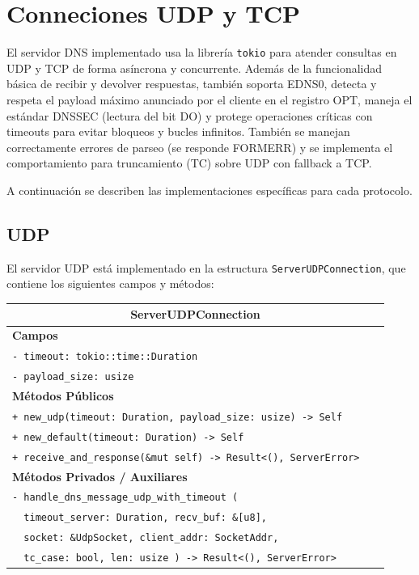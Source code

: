 \chapter{Conneciones UDP y TCP}

El servidor DNS implementado usa la librería \texttt{tokio} para atender consultas en UDP y TCP de forma asíncrona y concurrente. 
Además de la funcionalidad básica de recibir y devolver respuestas, también soporta EDNS0, detecta y respeta el payload máximo 
anunciado por el cliente en el registro OPT, maneja el estándar DNSSEC (lectura del bit DO) y protege operaciones críticas
con timeouts para evitar bloqueos y bucles infinitos. También se manejan correctamente errores de parseo (se responde FORMERR) y
se implementa el comportamiento para truncamiento (TC) sobre UDP con fallback a TCP.

A continuación se describen las implementaciones específicas para cada protocolo.

\section{UDP}

El servidor UDP está implementado en la estructura \texttt{ServerUDPConnection}, que contiene los siguientes campos y métodos:

\begin{table}[h!]
\centering
\renewcommand{\arraystretch}{1,1}

\begin{tabular}{|p{0.95\linewidth}|}
\hline
\multicolumn{1}{|c|}{\textbf{ServerUDPConnection}} \\
\hline
\textbf{Campos} \\
\hline
\texttt{- timeout: tokio::time::Duration} \\
\texttt{- payload\_size: usize} \\
\hline
\textbf{Métodos Públicos} \\
\hline
\texttt{+ new\_udp(timeout: Duration, payload\_size: usize) -> Self} \\
\texttt{+ new\_default(timeout: Duration) -> Self} \\
\texttt{+ receive\_and\_response(\&mut self) -> Result<(), ServerError>} \\
\hline
\textbf{Métodos Privados / Auxiliares} \\
\hline
\texttt{- handle\_dns\_message\_udp\_with\_timeout (} \\
\texttt{\ \ timeout\_server: Duration, recv\_buf: \&[u8],} \\
\texttt{\ \ socket: \&UdpSocket, client\_addr: SocketAddr,} \\
\texttt{\ \ tc\_case: bool, len: usize ) ->  Result<(), ServerError>} \\
\hline
\end{tabular}
\end{table}

